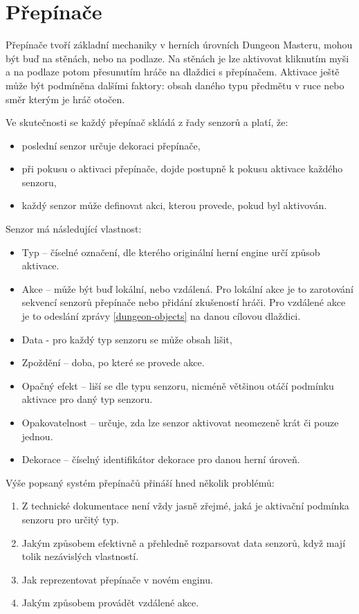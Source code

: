 \section{Přepínače}\label{actuator-analyza}
Přepínače tvoří základní mechaniky v herních úrovních Dungeon Masteru, mohou být buď na stěnách, nebo na podlaze. 
Na stěnách je lze aktivovat kliknutím myši a na podlaze potom přesunutím hráče na dlaždici s přepínačem. Aktivace ještě
může být podmíněna dalšími faktory: obsah daného typu předmětu v ruce nebo směr kterým je hráč otočen.  

Ve skutečnosti se každý přepínač skládá z řady senzorů a platí, že:
\begin{itemize}
\item poslední senzor určuje dekoraci přepínače,
\item při pokusu o aktivaci přepínače, dojde postupně k pokusu aktivace každého senzoru,
\item každý senzor může definovat akci, kterou provede, pokud byl aktivován.
\end{itemize}

Senzor má následující vlastnost:
\begin{itemize}
\item Typ -- číselné označení, dle kterého originální herní engine určí způsob aktivace.
\item Akce -- může být buď lokální, nebo vzdálená. Pro lokální akce je to zarotování sekvencí senzorů 
	přepínače nebo přidání zkušeností hráči. Pro vzdálené akce je to odeslání zprávy \vref{dungeon-objects} na danou cílovou dlaždici. 
\item Data - pro každý typ senzoru se může obsah lišit,  
\item Zpoždění -- doba, po které se provede akce.
\item Opačný efekt -- liší se dle typu senzoru, nicméně většinou otáčí podmínku aktivace pro daný typ senzoru. 
\item Opakovatelnost -- určuje, zda lze senzor aktivovat neomezeně krát či pouze jednou.
\item Dekorace  -- číselný identifikátor dekorace pro danou herní úroveň.
\end{itemize}

Výše popsaný systém přepínačů přináší hned několik problémů:
\begin{enumerate}[label=\textbf{P\arabic*}]
\item\label{actuator-unclear} Z technické dokumentace \cite{TechnicalDocumentationFontanel05} není vždy jasně zřejmé, jaká je aktivační podmínka senzoru pro určitý typ.
\item\label{actuator-effective} Jakým způsobem efektivně a přehledně rozparsovat data senzorů, když mají tolik nezávislých vlastností.
\item\label{actuator-representation} Jak reprezentovat přepínače v novém enginu.
\item\label{actuator-remote-actions} Jakým způsobem provádět vzdálené akce.
\end{enumerate}

